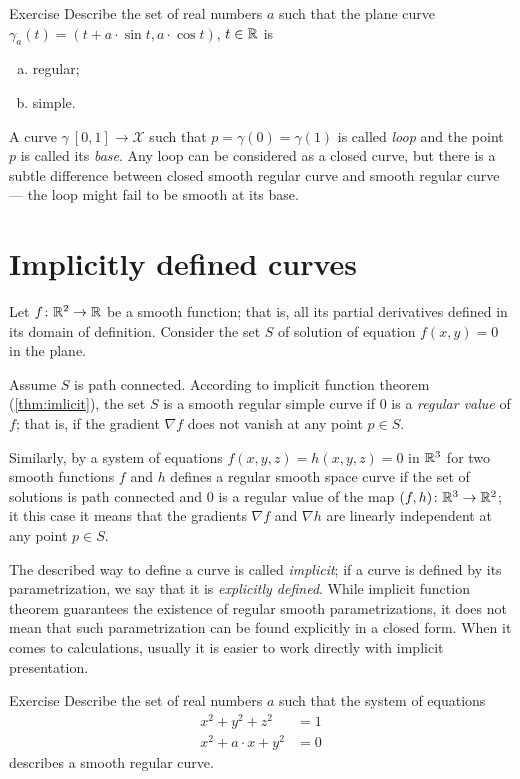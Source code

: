\begin{thm}{Exercise}\label{ex:cycloid}
Describe the set of real numbers $a$
such that the plane curve $\gamma_a(t)= (t+a\cdot \sin t,a\cdot \cos t)$, $t\in\mathbb{R}$ is
\begin{enumerate}[(a)]
\item regular;
\item simple.
\end{enumerate}

\end{thm}

A curve $\gamma\:[0,1]\to \mathcal{X}$ such that $p=\gamma(0)=\gamma(1)$ is called \emph{loop} and the point $p$ is called its \emph{base}.
Any loop can be considered as a closed curve, but there is a subtle difference between closed smooth regular curve and smooth regular curve --- the loop might fail to be smooth at its base.


\section*{Implicitly defined curves}

Let $f\colon\mathbb{R}^2\to \mathbb{R}$ be a smooth function; 
that is, all its partial derivatives defined in its domain of definition.
Consider the set $S$ of solution of equation $f(x,y)=0$ in the plane.

Assume $S$ is path connected.
According to implicit function theorem (\ref{thm:imlicit}), the set $S$ is a smooth regular simple curve if $0$ is a \emph{regular value} of $f$;
that is, if the gradient $\nabla f$ does not vanish at any point $p\in S$.

Similarly, by a system of equations
$f(x,y,z)=h(x,y,z)=0$ in $\mathbb{R}^3$ for two smooth functions $f$ and $h$
defines a regular smooth space curve if the set of solutions is path connected and $0$ is a regular value of the map $(f,h)\colon\mathbb{R}^3\to\mathbb{R}^2$;
it this case it means that the gradients $\nabla f$ and $\nabla h$ are linearly independent at any point $p\in S$.

The described way to define a curve is called \emph{implicit};
if a curve is defined by its parametrization, we say that it is \emph{explicitly defined}.
While implicit function theorem guarantees the existence of regular smooth parametrizations, it does not mean that such parametrization can be found explicitly in a closed form. 
When it comes to calculations, usually it is easier to work directly with implicit presentation. 


\begin{thm}{Exercise}\label{ex:viviani}
Describe the set of real numbers $a$
such that the system of equations
\begin{align*}
x^2+y^2+z^2&=1
\\
x^2+a\cdot x+y^2&=0
\end{align*}
describes a smooth regular curve.
\end{thm}



